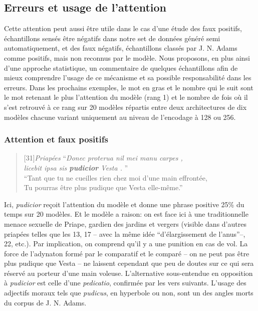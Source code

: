 \subsection{Erreurs et usage de l'attention}

Cette attention peut aussi être utile dans le cas d'une étude des faux positifs, échantillons sensés être négatifs dans notre set de données généré semi automatiquement, et des faux négatifs, échantillons classés par J. N. Adams comme positifs, mais non reconnus par le modèle. Nous proposons, en plus ainsi d'une approche statistique, un commentaire de quelques échantillons afin de mieux comprendre l'usage de ce mécanisme et sa possible responsabilité dans les erreurs. Dans les prochains exemples, le mot en gras et le nombre qui le suit sont le mot retenant le plus l'attention du modèle (rang 1) et le nombre de fois où il s'est retrouvé à ce rang sur 20 modèles répartis entre deux architectures de dix modèles chacune variant uniquement au niveau de l'encodage à 128 ou 256.

\subsubsection{Attention et faux positifs}

\begin{quote}[31]{\textit{Priapées}}
    \enquote{\textit{Donec proterua nil mei manu carpes ,{\\}  licebit ipsa sis \textbf{pudicior} Vesta . }} \\
    \enquote{Tant que tu ne cueilles rien chez moi d’une main effrontée, {\\} Tu pourras être plus pudique que Vesta elle-même.}
\end{quote}

Ici, \textit{pudicior} reçoit l'attention du modèle et donne une phrase positive 25\% du temps sur 20 modèles. Et le modèle a raison: on est face ici à une traditionnelle menace sexuelle de Priape, gardien des jardins et vergers (visible dans d'autres priapées telles que les 13, 17 -- avec la même idée \enquote{d'élargissement de l'anus}--, 22, etc.). Par implication, on comprend qu'il y a une punition en cas de vol. La force de l'adynaton formé par le comparatif et le comparé -- on ne peut pas être plus pudique que Vesta -- ne laissent cependant que peu de doutes sur ce qui sera réservé au porteur d'une main voleuse. L'alternative sous-entendue en opposition à \textit{pudicior} est celle d'une \textit{pedicatio}, confirmée par les vers suivants. L'usage des adjectifs moraux tels que \textit{pudicus}, en hyperbole ou non, sont un des angles morts du corpus de J. N. Adams.

